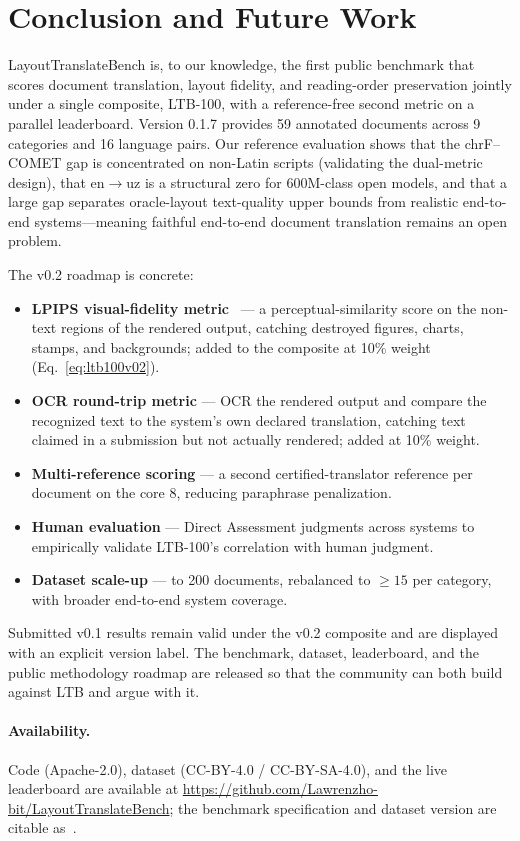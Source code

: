 \documentclass[11pt]{article}
\begin{document}
\section{Conclusion and Future Work}
\label{sec:conclusion}

LayoutTranslateBench is, to our knowledge, the first public benchmark that
scores document translation, layout fidelity, and reading-order preservation
jointly under a single composite, LTB-100, with a reference-free second metric
on a parallel leaderboard. Version 0.1.7 provides 59 annotated documents across
9 categories and 16 language pairs. Our reference evaluation shows that the
chrF--COMET gap is concentrated on non-Latin scripts (validating the dual-metric
design), that en$\rightarrow$uz is a structural zero for 600M-class open models,
and that a large gap separates oracle-layout text-quality upper bounds from
realistic end-to-end systems---meaning faithful end-to-end document translation
remains an open problem.

The v0.2 roadmap is concrete:
\begin{itemize}
  \item \textbf{LPIPS visual-fidelity metric}~\citep{zhang2018lpips} --- a
  perceptual-similarity score on the non-text regions of the rendered output,
  catching destroyed figures, charts, stamps, and backgrounds; added to the
  composite at 10\% weight (Eq.~\ref{eq:ltb100v02}).
  \item \textbf{OCR round-trip metric} --- OCR the rendered output and compare
  the recognized text to the system's own declared translation, catching text
  claimed in a submission but not actually rendered; added at 10\% weight.
  \item \textbf{Multi-reference scoring} --- a second certified-translator
  reference per document on the core 8, reducing paraphrase penalization.
  \item \textbf{Human evaluation} --- Direct Assessment judgments across systems
  to empirically validate LTB-100's correlation with human judgment.
  \item \textbf{Dataset scale-up} --- to 200 documents, rebalanced to $\geq 15$
  per category, with broader end-to-end system coverage.
\end{itemize}
Submitted v0.1 results remain valid under the v0.2 composite and are displayed
with an explicit version label. The benchmark, dataset, leaderboard, and the
public methodology roadmap are released so that the community can both build
against LTB and argue with it.

\paragraph{Availability.} Code (Apache-2.0), dataset (CC-BY-4.0 /
CC-BY-SA-4.0), and the live leaderboard are available at
\url{https://github.com/Lawrenzho-bit/LayoutTranslateBench}; the benchmark
specification and dataset version are citable as~\citet{ltbench2026}.




\end{document}

